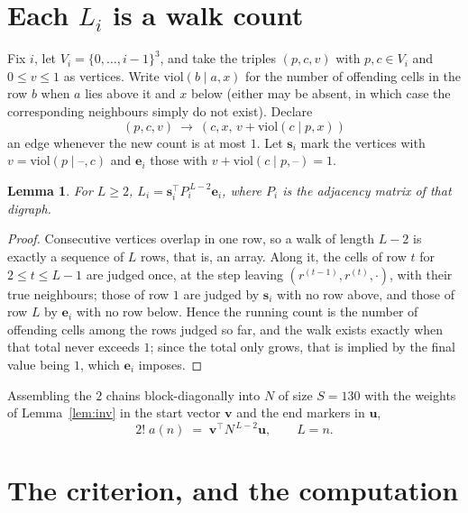 \documentclass[11pt,a4paper]{article}
\theoremstyle{plain}
\newtheorem{lemma}[theorem]{Lemma}
\theoremstyle{definition}
\begin{document}
\section{Each $L_i$ is a walk count}

Fix $i$, let $V_i=\{0,\dots,i-1\}^{3}$, and take the triples $(p,c,v)$ with
$p,c\in V_i$ and $0\le v\le1$ as vertices. Write $\mathrm{viol}(b\mid a,x)$ for the number
of offending cells in the row $b$ when $a$ lies above it and $x$ below (either may be
absent, in which case the corresponding neighbours simply do not exist). Declare
\[
(p,c,v)\ \longrightarrow\ (c,x,\,v+\mathrm{viol}(c\mid p,x))
\]
an edge whenever the new count is at most $1$. Let $\mathbf{s}_i$ mark the vertices with
$v=\mathrm{viol}(p\mid\text{--},c)$ and $\mathbf{e}_i$ those with
$v+\mathrm{viol}(c\mid p,\text{--})=1$.

\begin{lemma}\label{lem:walk}
For $L\ge2$, $L_i=\mathbf{s}_i^{\!\top}P_i^{\,L-2}\mathbf{e}_i$, where $P_i$ is the
adjacency matrix of that digraph.
\end{lemma}

\begin{proof}
Consecutive vertices overlap in one row, so a walk of length $L-2$ is exactly a sequence
of $L$ rows, that is, an array. Along it, the cells of row $t$ for $2\le t\le L-1$ are
judged once, at the step leaving $(r^{(t-1)},r^{(t)},\cdot)$, with their true neighbours;
those of row $1$ are judged by $\mathbf{s}_i$ with no row above, and those of row
$L$ by $\mathbf{e}_i$ with no row below. Hence the running count is the number of
offending cells among the rows judged so far, and the walk exists exactly when that total
never exceeds $1$; since the total only grows, that is implied by the final value being
$1$, which $\mathbf{e}_i$ imposes.
\end{proof}

Assembling the $2$ chains block-diagonally into $N$ of size $S=130$ with the weights of
Lemma~\ref{lem:inv} in the start vector $\mathbf{v}$ and the end markers in
$\mathbf{u}$,
\begin{equation}\label{eq:walk2}
2!\;a(n)\;=\;\mathbf{v}^{\!\top}N^{\,L-2}\mathbf{u},\qquad L=n .
\end{equation}

\section{The criterion, and the computation}
\end{document}
